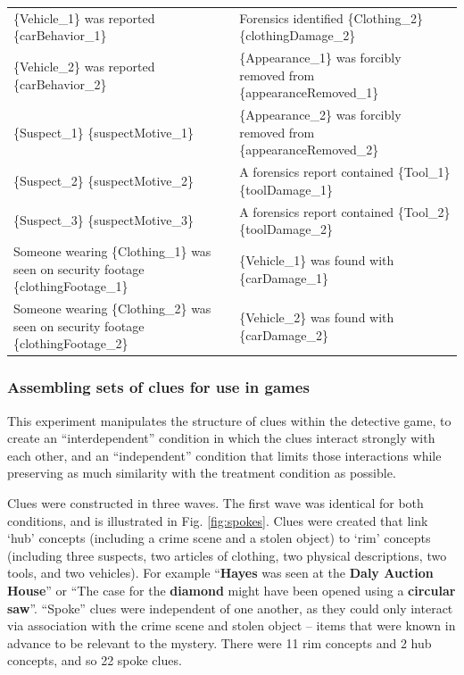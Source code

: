 \documentclass{article}
\begin{document}
\begin{landscape}
\begin{table}[]
\begin{tabular}{ll}
\{Vehicle\_1\}   was reported \{carBehavior\_1\} & Forensics identified   \{Clothing\_2\} \{clothingDamage\_2\} \\
\{Vehicle\_2\}   was reported \{carBehavior\_2\} & \{Appearance\_1\} was forcibly   removed from \{appearanceRemoved\_1\} \\
\{Suspect\_1\}   \{suspectMotive\_1\} & \{Appearance\_2\} was forcibly   removed from \{appearanceRemoved\_2\} \\
\{Suspect\_2\}   \{suspectMotive\_2\} & A forensics report contained   \{Tool\_1\} \{toolDamage\_1\} \\
\{Suspect\_3\}   \{suspectMotive\_3\} & A forensics report contained   \{Tool\_2\} \{toolDamage\_2\} \\
Someone   wearing \{Clothing\_1\} was seen on security footage \{clothingFootage\_1\} & \{Vehicle\_1\} was found with   \{carDamage\_1\} \\
Someone   wearing \{Clothing\_2\} was seen on security footage \{clothingFootage\_2\} & \{Vehicle\_2\} was found with   \{carDamage\_2\}
\end{tabular}
\end{table}

\end{landscape}
\restoregeometry

\subsubsection{Assembling sets of clues for use in games}
This experiment manipulates the structure of clues within the detective game, to create an ``interdependent'' condition in which the clues interact strongly with each other, and an ``independent'' condition that limits those interactions while preserving as much similarity with the treatment condition as possible. 

Clues were constructed in three waves. The first wave was identical for both conditions, and is illustrated in Fig. \ref{fig:spokes}. Clues were created that link ‘hub’ concepts (including a crime scene and a stolen object) to ‘rim’ concepts (including three suspects, two articles of clothing, two physical descriptions, two tools, and two vehicles). For example “\textbf{Hayes} was seen at the \textbf{Daly Auction House}” or “The case for the \textbf{diamond} might have been opened using a \textbf{circular saw}”. “Spoke” clues were independent of one another, as they could only interact via association with the crime scene and stolen object – items that were known in advance to be relevant to the mystery. There were 11 rim concepts and 2 hub concepts, and so 22 spoke clues.
\end{document}
